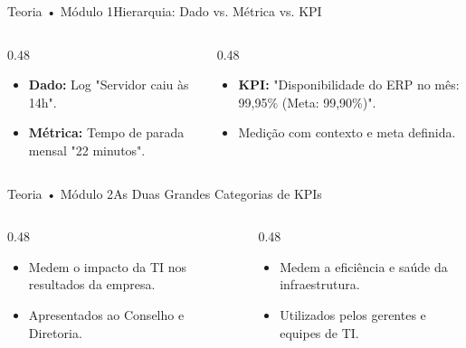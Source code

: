 \begin{senaiframe}{Teoria • Módulo 1}{Hierarquia: Dado vs. Métrica vs. KPI}
  \begin{columns}[t]
    \begin{column}{0.48\textwidth}
      \begin{tcolorbox}[senaibluecard, title={Dado \& Métrica}]
        \begin{itemize}
          \item \textbf{Dado:} Log "Servidor caiu às 14h".
          \item \textbf{Métrica:} Tempo de parada mensal "22 minutos".
        \end{itemize}
      \end{tcolorbox}
    \end{column}
    \begin{column}{0.48\textwidth}
      \begin{tcolorbox}[senaigreencard, title={KPI (Indicador Chave)}]
        \begin{itemize}
          \item \textbf{KPI:} "Disponibilidade do ERP no mês: 99,95\% (Meta: 99,90\%)".
          \item Medição com contexto e meta definida.
        \end{itemize}
      \end{tcolorbox}
    \end{column}
  \end{columns}
\end{senaiframe}

\begin{senaiframe}{Teoria • Módulo 2}{As Duas Grandes Categorias de KPIs}
  \begin{columns}[t]
    \begin{column}{0.48\textwidth}
      \begin{tcolorbox}[senaibluecard, title={KPIs do Negócio (Estratégicos)}]
        \begin{itemize}
          \item Medem o impacto da TI nos resultados da empresa.
          \item Apresentados ao Conselho e Diretoria.
        \end{itemize}
      \end{tcolorbox}
    \end{column}
    \begin{column}{0.48\textwidth}
      \begin{tcolorbox}[senaicard, title={KPIs Operacionais (Técnicos)}]
        \begin{itemize}
          \item Medem a eficiência e saúde da infraestrutura.
          \item Utilizados pelos gerentes e equipes de TI.
        \end{itemize}
      \end{tcolorbox}
    \end{column}
  \end{columns}
\end{senaiframe}

